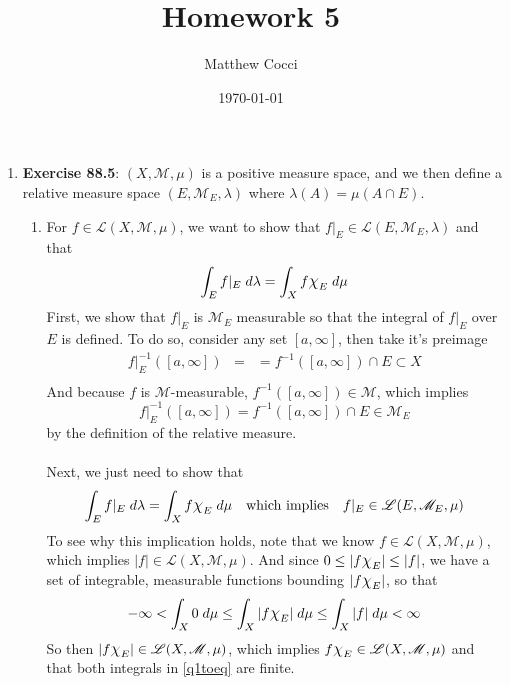 \documentclass[12pt]{article}
\author{Matthew Cocci}
\title{\textbf{Homework 5}}
\date{\today}
\theoremstyle{plain}
\theoremstyle{definition}
\theoremstyle{remark}
\newcommand*{\Chi}{\mbox{\large$\chi$}} %
\begin{document}
\maketitle 

\begin{enumerate} 

\item \textbf{Exercise 88.5}: $(X,\mathscr{M},\mu)$ is a positive measure space, and we then define a relative measure space $(E,\mathscr{M}_E,\lambda)$ where $\lambda(A)=\mu(A\cap E)$.

\begin{enumerate}
\item For $f\in\mathscr{L}(X,\mathscr{M},\mu)$, we want to show that $f|_E \in\mathscr{L}(E,\mathscr{M}_E,\lambda)$ and that
\[
    \int_E f|_E \; d\lambda = \int_X f \Chi_E\; d\mu
\]
First, we show that $f|_E$ is $\mathscr{M}_E$ measurable so that the integral of $f|_E$ over $E$ is defined. To do so, consider any set $[a,\infty]$, then take it's preimage
\begin{align*}
    f|_E^{-1}([a,\infty]) &= 
    &=f^{-1}([a,\infty]) \cap E \subset X\\
\end{align*}
And because $f$ is $\mathscr{M}$-measurable, $f^{-1}([a,\infty])\in \mathscr{M}$, which implies 
\[
    f|_E^{-1}([a,\infty]) = 
    f^{-1}([a,\infty]) \cap E \in \mathscr{M}_E
\]
by the definition of the relative measure. 
\\
\\
Next, we just need to show that 
\begin{equation}
    \label{q1toeq}
    \int_E f|_E \; d\lambda = \int_X f \Chi_E\; d\mu \quad 
    \text{which implies} \quad f|_E \in\mathscr{L}(E,\mathscr{M}_E,\mu)
\end{equation}
To see why this implication holds, note that we know $f\in\mathscr{L}(X,\mathscr{M},\mu)$, which implies $|f|\in\mathscr{L}(X,\mathscr{M},\mu)$. And since $0\leq|f\Chi_{E}|\leq|f|$, we have a set of integrable, measurable functions bounding $|f\Chi_E|$, so that 
\begin{equation}
    -\infty < \int_X 0\;d\mu \leq \int_X |f\Chi_E| \; d\mu \leq \int_X |f| \; d\mu 
    < \infty 
\end{equation}
So then $|f\Chi_E|\in\mathscr{L}(X,\mathscr{M},\mu)$, which implies $f\Chi_E\in\mathscr{L}(X,\mathscr{M},\mu)$ and that both integrals in \ref{q1toeq} are finite.
\\
\\

\end{enumerate}
\end{enumerate}
\end{document}
